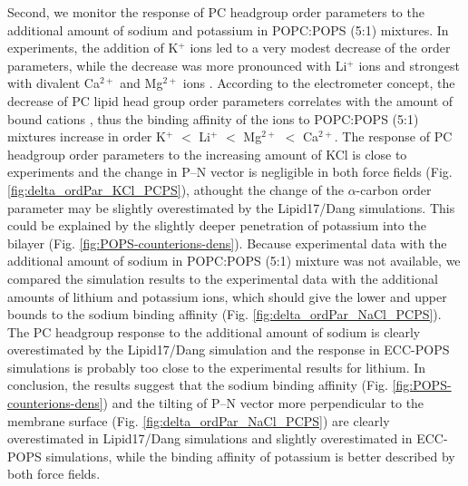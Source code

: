 \documentclass[journal=jpcbfk,manuscript=article]{achemso}
\begin{document}
Second, we monitor the response of PC headgroup order parameters to the additional
amount of sodium and potassium in POPC:POPS (5:1) mixtures.
In experiments, the addition of K$^+$ ions led to a very modest decrease of the order parameters,
while the decrease was more pronounced with Li$^+$ ions and strongest with divalent Ca$^{2+}$ and Mg$^{2+}$ ions \cite{roux90}.
According to the electrometer concept, the decrease of PC lipid head group order parameters
correlates with the amount of bound cations \cite{akutsu81,altenbach84,seelig87,roux90,catte16,NMRlipidsIV},
thus the binding affinity of the ions to POPC:POPS (5:1) mixtures increase in order K$^{+}$ $<$ Li$^{+}$  $<$ Mg$^{2+}$  $<$ Ca$^{2+}$.
The response of PC headgroup order parameters to the increasing amount of KCl is close to experiments
and the change in P--N vector is negligible in both force fields (Fig. \ref{fig:delta_ordPar_KCl_PCPS}), athought the change of the $\alpha$-carbon
order parameter may be slightly overestimated by the Lipid17/Dang simulations. This could be
explained by the slightly deeper penetration of potassium into the bilayer (Fig. \ref{fig:POPS-counterions-dens}).
Because experimental data with the additional amount of sodium in POPC:POPS (5:1) mixture was not available,
we compared the simulation results to the experimental data with the additional amounts of
lithium and potassium ions, which should give the lower and upper bounds to the sodium binding
affinity (Fig. \ref{fig:delta_ordPar_NaCl_PCPS}). The PC headgroup response to the additional
amount of sodium is clearly overestimated by the Lipid17/Dang simulation and
the response in ECC-POPS simulations is probably too close to the experimental results for lithium.
In conclusion, the results suggest that the sodium binding affinity (Fig. \ref{fig:POPS-counterions-dens}) and
the tilting of P--N vector more perpendicular to the membrane surface (Fig. \ref{fig:delta_ordPar_NaCl_PCPS})
are clearly overestimated in Lipid17/Dang simulations and slightly overestimated in ECC-POPS simulations,
while the binding affinity of potassium is better described by both force fields.

\end{document}
